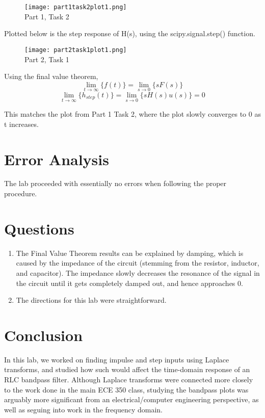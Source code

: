 \documentclass[11pt,a4,titlepage]{article}
\begin{document}
\begin{figure}[H]
	\centering
	\texttt{[image: part1task2plot1.png]}
	\\ Part 1, Task 2
\end{figure}

Plotted below is the step response of H(s), using the scipy.signal.step() function.

\begin{figure}[H]
	\centering
	\texttt{[image: part2task1plot1.png]}
	\\ Part 2, Task 1
\end{figure}

Using the final value theorem,
\[ \lim_{t\to\infty}\{f(t)\} = \lim_{s\to 0} \{sF(s)\}\]
\[ \lim_{t\to\infty}\{h_{step}(t)\} = \lim_{s\to 0} \{sH(s)u(s)\} = 0\]

This matches the plot from Part 1 Task 2, where the plot slowly converges to 0 as t increases.

\section{Error Analysis}
The lab proceeded with essentially no errors when following the proper procedure.

\section{Questions}
\begin{enumerate}
	\item The Final Value Theorem results can be explained by damping, which is caused by the impedance of the circuit (stemming from the resistor, inductor, and capacitor). The impedance slowly decreases the resonance of the signal in the circuit until it gets completely damped out, and hence approaches 0.
	\item The directions for this lab were straightforward.
\end{enumerate}

\section{Conclusion}
In this lab, we worked on finding impulse and step inputs using Laplace transforms, and studied how such would affect the time-domain response of an RLC bandpass filter. Although Laplace transforms were connected more closely to the work done in the main ECE 350 class, studying the bandpass plots was arguably more significant from an electrical/computer engineering perspective, as well as seguing into work in the frequency domain.
\end{document}
